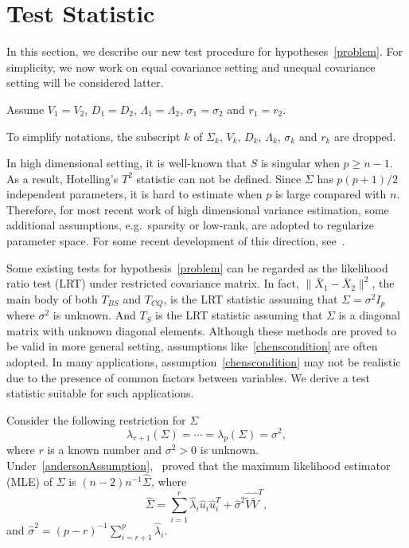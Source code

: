 
\section{Test Statistic}

In this section, we describe our new test procedure for hypotheses~\eqref{problem}. For simplicity, we now work on equal covariance setting and unequal covariance setting will be considered latter.
\begin{assumption}\label{theModel2}
Assume $V_1=V_2$, $D_1=D_2$, $\Lambda_1=\Lambda_2$, $\sigma_1=\sigma_2$ and $r_1=r_2$.
\end{assumption}

To simplify notations, the subscript $k$ of $\Sigma_k$, $V_k$, $D_k$, $\Lambda_k$, $\sigma_k$ and $r_k$ are dropped.

In high dimensional setting, it is well-known that $S$ is singular when $p\geq n-1$.
As a result, Hotelling's $T^2$ statistic can not be defined.
Since $\Sigma$ has $p(p+1)/2$ independent parameters, it is hard to estimate when $p$ is large compared with $n$.
Therefore, for most recent work of high dimensional variance estimation, some additional assumptions, e.g.\ sparsity or low-rank, are adopted to regularize parameter space. For some recent development of this direction, see~\cite{Fan2015An}. 


Some existing tests for hypothesis~\eqref{problem} can be regarded as the likelihood ratio test (LRT) under restricted covariance matrix.
In fact, $\|\bar{X}_1-\bar{X}_2\|^2$, the main body of both $T_{BS}$ and $T_{CQ}$, is the LRT statistic assuming that $\Sigma=\sigma^2 I_p$ where $\sigma^2$ is unknown.
And $T_S$ is the LRT statistic assuming that $\Sigma$ is a diagonal matrix with unknown diagonal elements.
Although these methods are proved to be valid in more general setting, assumptions like~\eqref{chenscondition} are often adopted. 
In many applications, assumption~\eqref{chenscondition} may not be realistic due to the presence of common factors between variables.
We derive a test statistic suitable for such applications.

Consider the following restriction for $\Sigma$
\begin{equation}\label{andersonAssumption}
    \lambda_{r+1}(\Sigma)=\cdots=\lambda_p(\Sigma)=\sigma^2,
\end{equation}
    where $r$ is a known number and $\sigma^2>0$ is unknown.
    Under~\eqref{andersonAssumption},~\cite{Anderson1986Asymptotic} proved that the maximum likelihood estimator (MLE) of $\Sigma$ is $(n-2)n^{-1}\hat{\Sigma}$, where
    $$
    \hat{\Sigma}=\sum_{i=1}^r \hat{\lambda}_i \hat{u}_i \hat{u}_i^T
    +\hat{\sigma}^2 \hat{\tilde{V}}\hat{\tilde{V}}^T,
    $$
and $\hat{\sigma}^2=(p-r)^{-1}\sum_{i=r+1}^p \hat{\lambda}_i$.
    
